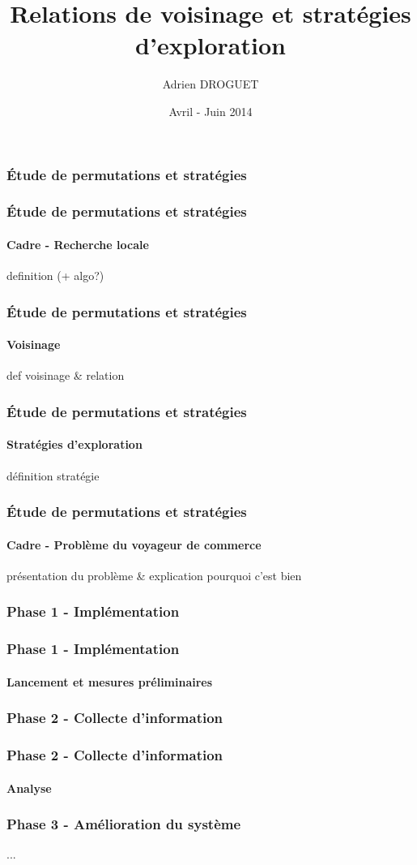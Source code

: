\documentclass{beamer}
\title{Relations de voisinage et stratégies d'exploration}
\author{Adrien DROGUET}
\date{Avril - Juin 2014}
\begin{document}
\frame{\titlepage}

\begin{frame}
  \frametitle{Étude de permutations et stratégies}
  
  
\end{frame}


\begin{frame}
  \frametitle{Étude de permutations et stratégies}
  \framesubtitle{Cadre - Recherche locale}
  definition (+ algo?)

  
\end{frame}


\begin{frame}
  \frametitle{Étude de permutations et stratégies}
  \framesubtitle{Voisinage}
  \begin{definition}
    def voisinage \& relation
  \end{definition}

  
\end{frame}


\begin{frame}
  \frametitle{Étude de permutations et stratégies}
  \framesubtitle{Stratégies d'exploration}
  \begin{definition}
    définition stratégie
  \end{definition}

  
\end{frame}


\begin{frame}
  \frametitle{Étude de permutations et stratégies}
  \framesubtitle{Cadre - Problème du voyageur de commerce}
  présentation du problème \& explication pourquoi c'est bien
  
\end{frame}



\begin{frame}
  \frametitle{Phase 1 - Implémentation}
  
  
\end{frame}


\begin{frame}
  \frametitle{Phase 1 - Implémentation}
  \framesubtitle{Lancement et mesures préliminaires}
  
  
\end{frame}



\begin{frame}
  \frametitle{Phase 2 - Collecte d'information}
  
  
\end{frame}


\begin{frame}
  \frametitle{Phase 2 - Collecte d'information}
  \framesubtitle{Analyse}
  
  
\end{frame}


\begin{frame}
  \frametitle{Phase 3 - Amélioration du système}
  
  ...
\end{frame}
\end{document}
